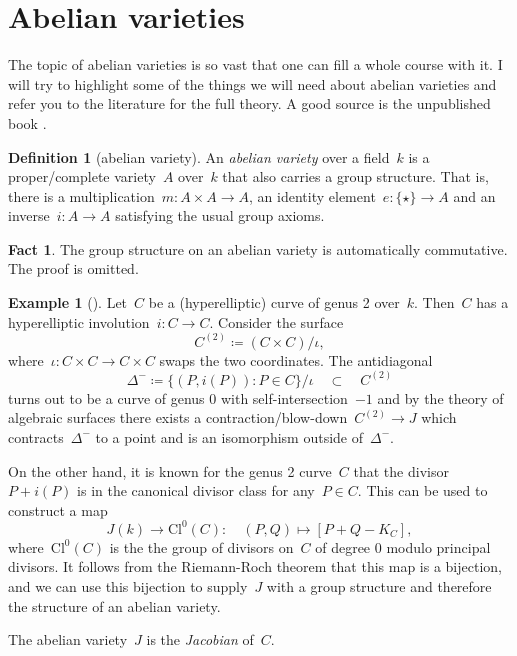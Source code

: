 \documentclass[12pt]{article}
\theoremstyle{definition}
\newtheorem{definition}[theorem]{Definition}
\newtheorem{fact}[theorem]{Fact}
\newtheorem{example}[theorem]{Example}
\numberwithin{equation}{subsection}
\begin{document}
\section{Abelian varieties}

The topic of abelian varieties is so vast that one can fill a whole course with it.
I will try to highlight some of the things we will need about abelian varieties and refer you to the literature for the full theory.
A good source is the unpublished book \cite{AbVarBook}.

\begin{definition}[abelian variety]
An {\em abelian variety} over a field~$k$ is a proper/complete variety~$A$ over~$k$ that also carries a group structure. That is, there is a multiplication~$m \colon A \times A \to A$, an identity element~$e \colon \{ \star \} \to A$ and an inverse~$i \colon A \to A$ satisfying the usual group axioms.
\end{definition}

\begin{fact}
The group structure on an abelian variety is automatically commutative. The proof is omitted.
\end{fact}

\begin{example}[\textrm{\cite[Example 1.10]{AbVarBook}}]
Let~$C$ be a (hyperelliptic) curve of genus 2 over~$k$.
Then~$C$ has a hyperelliptic involution~$i \colon C \to C$.
Consider the surface~$$C^{(2)} \coloneqq (C \times C) / \iota,$$ where~$\iota \colon C \times C \to C \times C$ swaps the two coordinates.
The antidiagonal~$$\Delta^{-} \coloneqq \{ (P, i(P)) : P \in C\}/\iota \quad \subset \quad C^{(2)}$$
turns out to be a curve of genus 0 with self-intersection~$-1$ and by the theory of algebraic surfaces there exists a contraction/blow-down~$C^{(2)} \to J$ which contracts~$\Delta^{-}$ to a point and is an isomorphism outside of~$\Delta^{-}$.

On the other hand, it is known for the genus 2 curve~$C$ that the divisor~$P + i(P)$ is in the canonical divisor class for any~$P \in C$.
This can be used to construct a map~$$J(k) \to \mathrm{Cl}^0(C) \colon \quad (P,Q) \mapsto [P + Q - K_C],$$ where~$\mathrm{Cl}^0(C)$ is the the group of divisors on~$C$ of degree 0 modulo principal divisors.
It follows from the Riemann-Roch theorem that this map is a bijection, and we can use this bijection to supply~$J$ with a group structure and therefore the structure of an abelian variety.

The abelian variety~$J$ is the {\em Jacobian} of~$C$.
\end{example}
\end{document}

